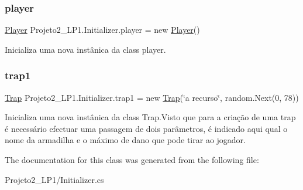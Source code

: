 \subsubsection{\texorpdfstring{player}{player}}
{\footnotesize\ttfamily \mbox{\hyperlink{class_projeto2___l_p1_1_1_player}{Player}} Projeto2\+\_\+\+L\+P1.\+Initializer.\+player = new \mbox{\hyperlink{class_projeto2___l_p1_1_1_player}{Player}}()}



Inicializa uma nova instânica da class player. 

\mbox{\label{class_projeto2___l_p1_1_1_initializer_a52528b8ea22dc356f6f3ea0a91e60d2d}} 
\subsubsection{\texorpdfstring{trap1}{trap1}}
{\footnotesize\ttfamily \mbox{\hyperlink{class_projeto2___l_p1_1_1_trap}{Trap}} Projeto2\+\_\+\+L\+P1.\+Initializer.\+trap1 = new \mbox{\hyperlink{class_projeto2___l_p1_1_1_trap}{Trap}}(\char`\"{}a recurso\char`\"{}, random.\+Next(0, 78))}



Inicializa uma nova instânica da class Trap.\+Visto que para a criação de uma trap é necessário efectuar uma passagem de dois parâmetros, é indicado aqui qual o nome da armadilha e o máximo de dano que pode tirar ao jogador. 



The documentation for this class was generated from the following file\+:\begin{DoxyCompactItemize}
\item 
Projeto2\+\_\+\+L\+P1/Initializer.\+cs\end{DoxyCompactItemize}
